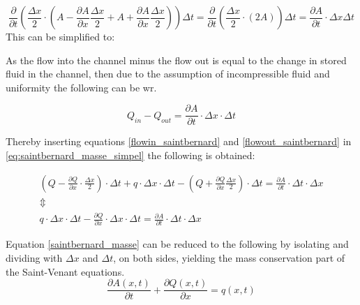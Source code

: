 \begin{equation}\label{stored_saintbernard}
\frac{\partial}{\partial t} \left(\frac{\Delta x}{2} \cdot \left(A- \frac{\partial A}{\partial x} \frac{\Delta x}{2} +A + \frac{\partial A}{\partial x} \frac{\Delta x}{2}	\right) \right) \Delta t = \frac{\partial}{\partial t} \left(\frac{\Delta x}{2} \cdot \left( 2 A	\right) \right) \Delta t = \frac{\partial A}{\partial t} \cdot \Delta x	\Delta t
\end{equation}
This can be simplified to:


As the flow into the channel minus the flow out is equal to the change in stored fluid in the channel, then due to the assumption of incompressible fluid and uniformity the following can be wr.  

\begin{equation}\label{eq:saintbernard_masse_simpel}
	Q_{in} - Q_{out} = \frac{\partial A}{\partial t} \cdot \Delta x	\cdot \Delta t
\end{equation}

Thereby inserting equations \ref{flowin_saintbernard} and \ref{flowout_saintbernard} in \ref{eq:saintbernard_masse_simpel} the following is obtained:

\begin{equation}
\begin{array}{l}
	\left(Q - \frac{\partial Q}{\partial x}\cdot \frac{\Delta x}{2}\right) \cdot \Delta t + q \cdot \Delta x \cdot \Delta t - \left(Q + \frac{\partial Q}{ \partial x} \frac{\Delta x}{2} \right) \cdot \Delta t  = \frac{\partial A}{\partial t}\cdot \Delta t 
	\cdot \Delta x \\ 
\Updownarrow \\
q \cdot \Delta x \cdot \Delta t  - \frac{\partial Q}{\partial x} \cdot \Delta x \cdot \Delta t  = \frac{\partial A}{\partial t} \cdot \Delta t 
	\cdot \Delta x 
\end{array}
\label{saintbernard_masse}
\end{equation}

Equation \ref{saintbernard_masse} can be reduced to the following by isolating and dividing with $\Delta x$ and $\Delta t$, on both sides, yielding the mass conservation part of the Saint-Venant equations.
\begin{equation}	
\frac{\partial A(x,t)}{\partial t} + \frac{\partial Q(x,t)}{\partial x}=q(x,t)
\label{saintbernard_mass_lateral}
\end{equation}

